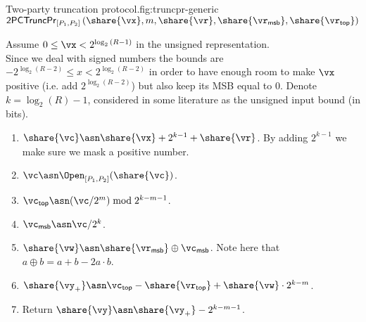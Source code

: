 \begin{Boxfig}{Two-party truncation protocol.}{fig:truncpr-generic}
  {$\mathsf{2PCTruncPr}_{[P_1, P_2]} \left( \share{\vx}, m, \share{\vr},
  \share{\vr_{\mathsf{msb}}}, \share{\vr_{\mathsf{top}}} \right)$}

  Assume $0 \leq \vx < 2^{\log_2{(R - 1})}$ in the unsigned representation. \\
  Since we deal with signed numbers the bounds are $-2^{\log_2{(R - 2)}} \leq x <
  2^{\log_2{(R - 2)}}$ in order to have enough room to make $\vx$ positive (i.e.
  add $2^{\log_2{(R-2)}}$) but also keep its MSB equal to $0$.  Denote $k =
  \log_2(R) - 1$, considered in some literature as the unsigned input bound (in bits).
  \begin{enumerate}
  \item $\share{\vc} \asn \share{\vx} + 2^{k-1} + \share{\vr}$. By adding $2^{k-1}$ we make sure we mask a positive number.
  \item $\vc \asn \Open_{[P_1, P_2]}(\share{\vc})$.
  \item $\vc_{\mathsf{top}} \asn (\vc / 2^m) \bmod 2^{k-m-1}$.

  \item $\vc_{\mathsf{msb}} \asn \vc / 2^{k}$.
  \item $\share{\vw} \asn \share{\vr_{\mathsf{msb}}} \oplus \vc_{\mathsf{msb}}$. Note here that $a \oplus b = a + b - 2a\cdot b$.
  \item $\share{\vy_+} \asn \vc_{\mathsf{top}} - \share{\vr_{\mathsf{top}}} + \share{\vw}  \cdot 2^{k-m}$.
  \item Return $\share{\vy} \asn \share{\vy_+} - 2^{k-m-1}$.
\end{enumerate}

\end{Boxfig}


